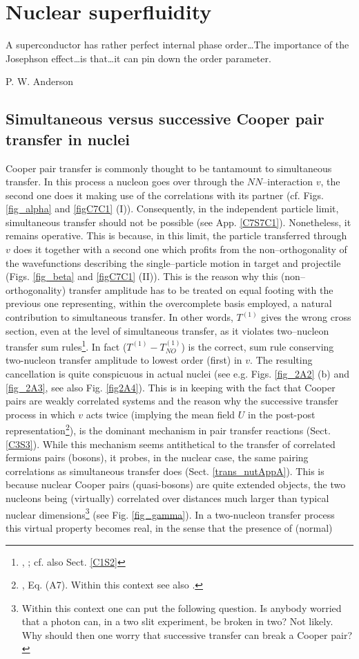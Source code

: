 \chapter[Simultaneous versus successive transfer]{Nuclear superfluidity}\label{chapter2}
 \epigraph{A superconductor has rather perfect internal phase order\dots The importance of the Josephson effect\dots is that\dots it can pin down the order parameter.}{P. W. Anderson}
\section{Simultaneous versus successive Cooper pair transfer in nuclei}\label{C2S1}
Cooper pair transfer is commonly thought to be tantamount to simultaneous transfer. In this process a nucleon goes over through the $NN$--interaction $v$, the second one does it making use of the correlations with its partner (cf. Figs. \ref{fig_alpha} and \ref{figC7C1} (I)). Consequently, in the independent particle limit, simultaneous  transfer should not be possible (see App. \ref{C7S7C1}). Nonetheless, it remains operative. This is because, in this limit, the particle transferred through $v$ does it together with a second one which profits from the non--orthogonality of the wavefunctions describing the single--particle motion in target and projectile (Figs. \ref{fig_beta} and \ref{figC7C1} (II)). This is the reason why this (non--orthogonality) transfer amplitude has to be treated on equal footing with  the previous one  representing, within the overcomplete basis employed, a natural contribution to simultaneous transfer. In other words, $T^{(1)}$ gives the wrong cross section, even at the level of simultaneous transfer, as it violates two--nucleon transfer sum rules\footnote{\cite{Broglia:72b}, \cite{Bayman:72}; cf. also Sect. \ref{C1S2}}. In fact ($T^{(1)}-T^{(1)}_{NO}$) is the correct, sum rule conserving two-nucleon transfer amplitude to lowest order (first) in $v$. The resulting cancellation is quite conspicuous in actual nuclei  (see e.g. Figs. \ref{fig_2A2} (b) and \ref{fig_2A3}, see also Fig. \ref{fig2A4}). This is in keeping with the fact that Cooper pairs are weakly correlated systems and the reason why the successive transfer process in which $v$ acts twice (implying the mean field $U$ in the post-post representation\footnote{\cite{Bayman:82,Potel:13}, Eq. (A7). Within this context see also \cite{Pinkston:82}.}), is the dominant mechanism in pair transfer reactions (Sect. \ref{C3S3}). While this mechanism seems antithetical to the transfer of  correlated fermions pairs (bosons), it probes, in the nuclear case, the same pairing correlations as simultaneous transfer does (Sect. \ref{trans_nutAppA}). This is because nuclear Cooper pairs (quasi-bosons) are quite extended objects, the two nucleons being (virtually) correlated over distances much larger than typical nuclear dimensions\footnote{Within this context one can put the following question. Is anybody worried that a photon can, in a two slit experiment, be broken in two? Not likely. Why should then one worry that successive transfer can break a Cooper pair?} (see Fig. \ref{fig_gamma}). In a two-nucleon transfer process this virtual property becomes real, in the sense that the presence of (normal) 